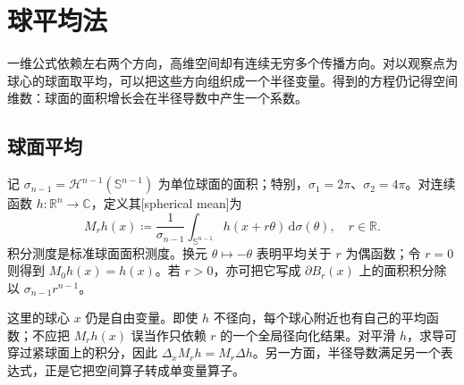 \section{球平均法}
\label{b2:sec:1101}

一维公式依赖左右两个方向，高维空间却有连续无穷多个传播方向。对以观察点为球心的球面取平均，可以把这些方向组织成一个半径变量。得到的方程仍记得空间维数：球面的面积增长会在半径导数中产生一个系数。

\subsection{球面平均}
\label{b2:subsec:110101}

记 \(\sigma_{n-1}=\mathcal H^{n-1}(\mathbb S^{n-1})\) 为单位球面的面积；特别，\(\sigma_1=2\pi\)、\(\sigma_2=4\pi\)。对连续函数 \(h:\mathbb R^n\to\mathbb C\)，定义其[spherical mean]为
\begin{equation}\label{b2:eq:11-spherical-mean}
 M_rh(x)\coloneqq\dfrac1{\sigma_{n-1}}
 \int_{\mathbb S^{n-1}}h(x+r\theta)\,\mathrm{d}\sigma(\theta),\quad r\in\mathbb R.
\end{equation}
积分测度是标准球面面积测度。换元 \(\theta\mapsto-\theta\) 表明平均关于 \(r\) 为偶函数；令 \(r=0\) 则得到 \(M_0h(x)=h(x)\)。若 \(r>0\)，亦可把它写成 \(\partial B_r(x)\) 上的面积积分除以 \(\sigma_{n-1}r^{n-1}\)。

\ProseParagraphBreak

这里的球心 \(x\) 仍是自由变量。即使 \(h\) 不径向，每个球心附近也有自己的平均函数；不应把 \(M_rh(x)\) 误当作只依赖 \(r\) 的一个全局径向化结果。对平滑 \(h\)，求导可穿过紧球面上的积分，因此 \(\Delta_xM_rh=M_r\Delta h\)。另一方面，半径导数满足另一个表达式，正是它把空间算子转成单变量算子。

